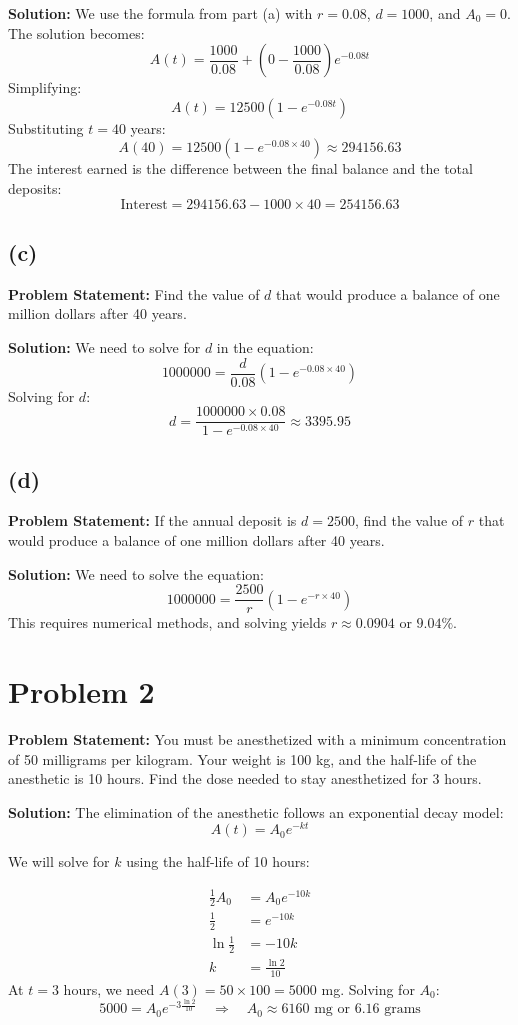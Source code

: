 \documentclass[12pt, letterpaper]{article}
\begin{document}
\textbf{Solution:}
We use the formula from part (a) with $r = 0.08$, $d = 1000$, and $A_0 = 0$. The solution becomes:
\[
A(t) = \frac{1000}{0.08} + \left(0 - \frac{1000}{0.08}\right)e^{-0.08t}
\]
Simplifying:
\[
A(t) = 12500(1 - e^{-0.08t})
\]
Substituting $t = 40$ years:
\[
A(40) = 12500(1 - e^{-0.08 \times 40}) \approx 294156.63
\]
The interest earned is the difference between the final balance and the total deposits:
\[
\text{Interest} = 294156.63 - 1000 \times 40 = 254156.63
\]

\subsection*{(c)}
\textbf{Problem Statement:}
Find the value of $d$ that would produce a balance of one million dollars after 40 years.

\textbf{Solution:}
We need to solve for $d$ in the equation:
\[
1000000 = \frac{d}{0.08}(1 - e^{-0.08 \times 40})
\]
Solving for $d$:
\[
d = \frac{1000000 \times 0.08}{1 - e^{-0.08 \times 40}} \approx 3395.95
\]

\subsection*{(d)}
\textbf{Problem Statement:}
If the annual deposit is $d = 2500$, find the value of $r$ that would produce a balance of one million dollars after 40 years.

\textbf{Solution:}
We need to solve the equation:
\[
1000000 = \frac{2500}{r}(1 - e^{-r \times 40})
\]
This requires numerical methods, and solving yields $r \approx 0.0904$ or $9.04\%$.

\section*{Problem 2}
\textbf{Problem Statement:}
You must be anesthetized with a minimum concentration of 50 milligrams per kilogram. Your weight is 100 kg, and the half-life of the anesthetic is 10 hours. Find the dose needed to stay anesthetized for 3 hours.

\textbf{Solution:}
The elimination of the anesthetic follows an exponential decay model:
\[
A(t) = A_0 e^{-kt}
\]

We will solve for $k$ using the half-life of 10 hours:

\begin{align*}
\frac{1}{2}A_0 &= A_0 e^{-10k} \\
\frac{1}{2} &= e^{-10k} \\
\ln \frac{1}{2} &= -10k \\
k &= \frac{\ln 2}{10}
\end{align*}
At $t = 3$ hours, we need $A(3) = 50 \times 100 = 5000$ mg. Solving for $A_0$:
\[
5000 = A_0 e^{-3 \frac{\ln 2}{10}} \quad \Rightarrow \quad A_0 \approx 6160 \text{ mg or 6.16 grams}
\]
\end{document}
